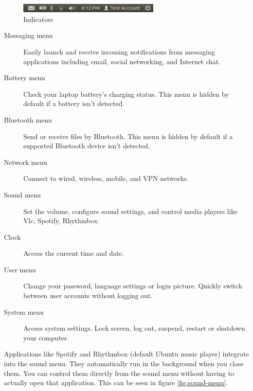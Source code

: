 \begin{figure}[h]	
	\centering
	\includegraphics[width=200pt]{./images/desktop/indicators.png}
	\caption{Indicators}	
	\label{fig:unity-indicators}		
\end{figure}

\begin{description}
	\item [Messaging menu] Easily launch and receive incoming notifications from messaging applications including email, social networking, and Internet chat.	
	\item [Battery menu] Check your laptop battery's charging status. This menu is hidden by default if a battery isn't detected.	
	\item [Bluetooth menu] Send or receive files by Bluetooth. This menu is hidden by default if a supported Bluetooth device isn't detected.	
	\item [Network menu] Connect to wired, wireless, mobile, and VPN networks.	
	\item [Sound menu] Set the volume, configure sound settings, and control media players like Vlc, Spotify, Rhythmbox.	
	\item [Clock] Access the current time and date.	
	\item [User menu] Change your password, language settings or login picture. Quickly switch between user accounts without logging out.	
	\item [System menu] Access system settings. Lock screen, log out, suspend, restart or shutdown your computer.	
\end{description}

\par \noindent Applications like Spotify and Rhythmbox (default Ubuntu music player) integrate into the sound menu. They automatically run in the background when you close them. You can control them directly from the sound menu without having to actually open that application. This can be seen in figure \ref{fig:sound-menu}. 

